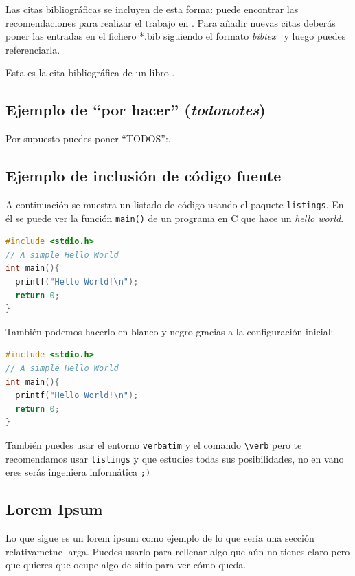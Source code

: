 Las citas bibliográficas se incluyen de esta forma: puede encontrar
las recomendaciones para realizar el trabajo en
\cite{recomendaciones}. Para añadir nuevas citas deberás poner las
entradas en el fichero \url{*.bib} siguiendo el formato
\emph{bibtex}~\cite{bibtex} y luego puedes referenciarla.

Esta es la cita bibliográfica de un libro \cite{stallings2006}.

\subsection{Ejemplo de ``por hacer'' (\emph{todonotes})}

Por supuesto puedes poner ``TODOS'':.


\subsection{Ejemplo de inclusión de código fuente}

A continuación se muestra un listado de código usando el paquete \verb|listings|. En él se puede ver la función \lstinline{main()} de un programa en C que hace un \emph{hello world}.
\begin{lstlisting}[language=c]
#include <stdio.h>
// A simple Hello World
int main(){
  printf("Hello World!\n");
  return 0;
}
\end{lstlisting}

También podemos hacerlo en blanco y negro gracias a la configuración inicial:
\begin{lstlisting}[language=c,style=nocolor]
#include <stdio.h>
// A simple Hello World
int main(){
  printf("Hello World!\n");
  return 0;
}
\end{lstlisting}

También puedes usar el entorno \texttt{verbatim} y el comando \verb|\verb| pero te recomendamos usar \verb|listings| y que estudies todas sus posibilidades, no en vano eres serás ingeniera informática \verb|;)|

\subsection{Lorem Ipsum}
Lo que sigue es un lorem ipsum como ejemplo de lo que sería una
sección relativametne larga. Puedes usarlo para rellenar algo que aún
no tienes claro pero que quieres que ocupe algo de sitio para ver cómo
queda.

\lipsum
